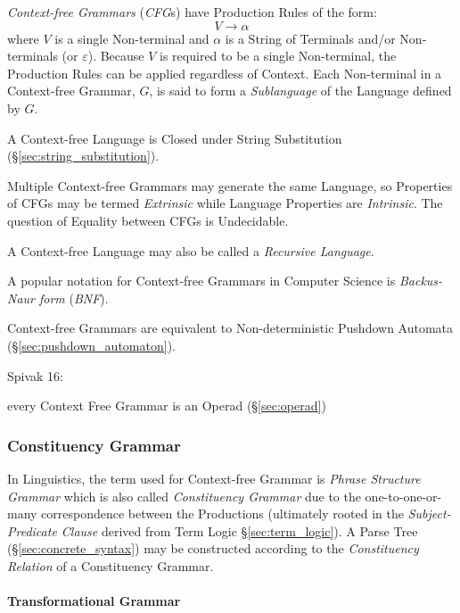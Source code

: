 \emph{Context-free Grammars} (\emph{CFG}s) have Production Rules of
the form:
\[
  V \rightarrow \alpha
\]
where $V$ is a single Non-terminal and $\alpha$ is a String of Terminals
and/or Non-terminals (or $\varepsilon$). Because $V$ is required to be a
single Non-terminal, the Production Rules can be applied regardless of
Context. Each Non-terminal in a Context-free Grammar, $G$, is said to
form a \emph{Sublanguage} of the Language defined by $G$.

A Context-free Language is Closed under String Substitution
(\S\ref{sec:string_substitution}).

Multiple Context-free Grammars may generate the same Language, so
Properties of CFGs may be termed \emph{Extrinsic} while Language
Properties are \emph{Intrinsic}. The question of Equality between CFGs
is Undecidable.

A Context-free Language may also be called a \emph{Recursive
  Language}.

A popular notation for Context-free Grammars in Computer Science is
\emph{Backus-Naur form} (\emph{BNF}).

Context-free Grammars are equivalent to Non-deterministic Pushdown
Automata (\S\ref{sec:pushdown_automaton}).

Spivak 16:

every Context Free Grammar is an Operad (\S\ref{sec:operad})



\subsubsection{Constituency Grammar}\label{sec:constituency_grammar}

In Linguistics, the term used for Context-free Grammar is \emph{Phrase
  Structure Grammar} which is also called \emph{Constituency Grammar}
due to the one-to-one-or-many correspondence between the Productions
(ultimately rooted in the \emph{Subject-Predicate Clause} derived from
Term Logic \S\ref{sec:term_logic}). A Parse Tree
(\S\ref{sec:concrete_syntax}) may be constructed according to the
\emph{Constituency Relation} of a Constituency Grammar.



\paragraph{Transformational Grammar}\label{sec:transformational_grammar}
\hfill



